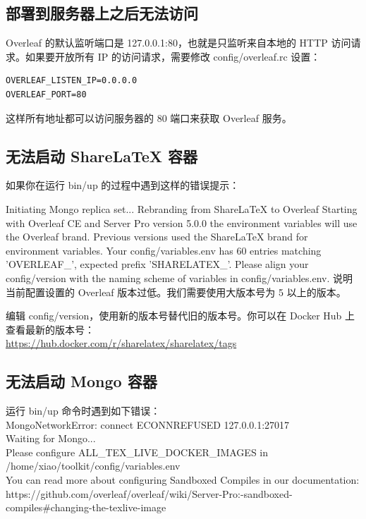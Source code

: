 \subsection{部署到服务器上之后无法访问}
Overleaf 的默认监听端口是 127.0.0.1:80，也就是只监听来自本地的 HTTP 访问请求。如果要开放所有 IP 的访问请求，需要修改 config/overleaf.rc 设置：
\begin{verbatim}
OVERLEAF_LISTEN_IP=0.0.0.0
OVERLEAF_PORT=80
\end{verbatim}
这样所有地址都可以访问服务器的 80 端口来获取 Overleaf 服务。



\subsection{无法启动 ShareLaTeX 容器}
如果你在运行 bin/up 的过程中遇到这样的错误提示：

Initiating Mongo replica set...
Rebranding from ShareLaTeX to Overleaf
  Starting with Overleaf CE and Server Pro version 5.0.0 the environment variables will use the Overleaf brand.
  Previous versions used the ShareLaTeX brand for environment variables.
  Your config/variables.env has 60 entries matching 'OVERLEAF\_', expected prefix 'SHARELATEX\_'.
  Please align your config/version with the naming scheme of variables in config/variables.env.
说明当前配置设置的 Overleaf 版本过低。我们需要使用大版本号为 5 以上的版本。

编辑 config/version，使用新的版本号替代旧的版本号。你可以在 Docker Hub 上查看最新的版本号：\\
\url{https://hub.docker.com/r/sharelatex/sharelatex/tags}



\subsection{无法启动 Mongo 容器}
运行 bin/up 命令时遇到如下错误：\\
MongoNetworkError: connect ECONNREFUSED 127.0.0.1:27017\\
Waiting for Mongo...\\
Please configure ALL\_TEX\_LIVE\_DOCKER\_IMAGES in /home/xiao/toolkit/config/variables.env\\
You can read more about configuring Sandboxed Compiles in our documentation:\\
  https://github.com/overleaf/overleaf/wiki/Server-Pro:-sandboxed-compiles\#changing-the-texlive-image

